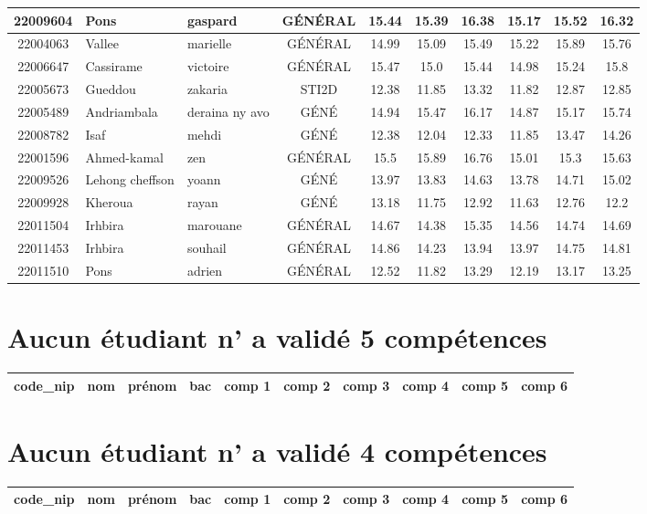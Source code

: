 \documentclass{article}%
\begin{document}
\begin{tabular}{|c|l|l|c|c|c|c|c|c|c|}
\hline%
22009604&Pons&gaspard&GÉNÉRAL&15.44&15.39&16.38&15.17&15.52&16.32\\%
\hline%
22004063&Vallee&marielle&GÉNÉRAL&14.99&15.09&15.49&15.22&15.89&15.76\\%
\hline%
22006647&Cassirame&victoire&GÉNÉRAL&15.47&15.0&15.44&14.98&15.24&15.8\\%
\hline%
22005673&Gueddou&zakaria&STI2D&12.38&11.85&13.32&11.82&12.87&12.85\\%
\hline%
22005489&Andriambala&deraina ny avo&GÉNÉ&14.94&15.47&16.17&14.87&15.17&15.74\\%
\hline%
22008782&Isaf&mehdi&GÉNÉ&12.38&12.04&12.33&11.85&13.47&14.26\\%
\hline%
22001596&Ahmed{-}kamal&zen&GÉNÉRAL&15.5&15.89&16.76&15.01&15.3&15.63\\%
\hline%
22009526&Lehong cheffson&yoann&GÉNÉ&13.97&13.83&14.63&13.78&14.71&15.02\\%
\hline%
22009928&Kheroua&rayan&GÉNÉ&13.18&11.75&12.92&11.63&12.76&12.2\\%
\hline%
22011504&Irhbira&marouane&GÉNÉRAL&14.67&14.38&15.35&14.56&14.74&14.69\\%
\hline%
22011453&Irhbira&souhail&GÉNÉRAL&14.86&14.23&13.94&13.97&14.75&14.81\\%
\hline%
22011510&Pons&adrien&GÉNÉRAL&12.52&11.82&13.29&12.19&13.17&13.25\\%
\hline%
\end{tabular}

%
\section*{Aucun étudiant n' a validé 5 compétences}%
\label{sec:Aucuntudiantnavalid5comptences}%
\begin{tabular}{|c|l|l|c|c|c|c|c|c|c|}%
\hline%
\rowcolor{vert}%
code\_nip&nom&prénom&bac&comp 1&comp 2&comp 3&comp 4&comp 5&comp 6\\%
\hline%
\end{tabular}

%
\section*{Aucun étudiant n' a validé 4 compétences}%
\label{sec:Aucuntudiantnavalid4comptences}%
\begin{tabular}{|c|l|l|c|c|c|c|c|c|c|}%
\hline%
\rowcolor{vert}%
code\_nip&nom&prénom&bac&comp 1&comp 2&comp 3&comp 4&comp 5&comp 6\\%
\hline%
\end{tabular}
\end{document}
